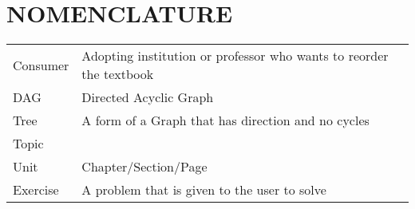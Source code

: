 %
%
%
%


\chapter*{NOMENCLATURE}

\vspace{-0.5in}
	\begin{table}[htbp]
	    \begin{tabular}{@{}p{} p{}@{}}
		Consumer & Adopting institution or professor who wants to reorder the textbook\\	[2ex] %
		DAG & Directed Acyclic Graph \\ [2ex]
		Tree & A form of a Graph that has direction and no cycles \\ [2ex]
		Topic & \\ [2ex]
		Unit & Chapter/Section/Page \\ [2ex]
		Exercise & A problem that is given to the user to solve\\ [2ex]
	    \end{tabular}%
	\end{table}

\pagebreak{}